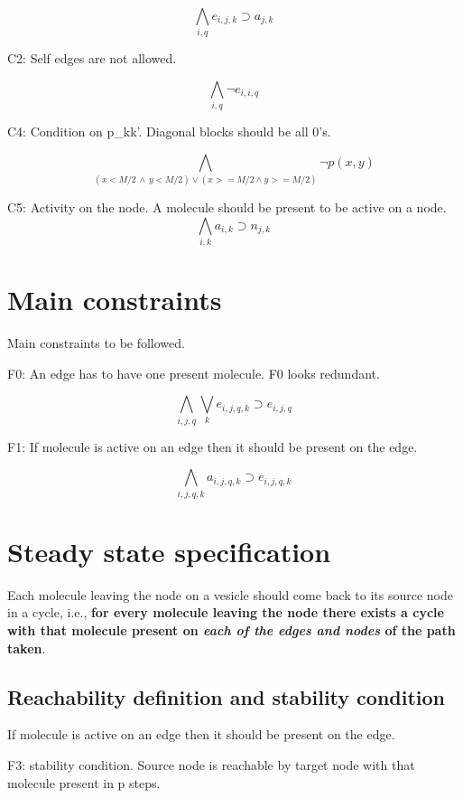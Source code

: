 \documentclass{llncs}
\begin{document}
\[ \bigwedge\limits_{i,q}  e_{i,j,k} \supset a_{j,k} \, \]  

C2: Self edges are not allowed. 

\[  \bigwedge\limits_{i,q} \neg e_{i,i,q} \, \]

C4: Condition on p\_kk'. Diagonal blocks should be all 0's.

\[ \bigwedge\limits_{(x < M/2 \, \land  \, y < M/2) \lor  (x >= M/2 \land y >= M/2)} \neg p(x,y) \, \]

C5: Activity on the node. A molecule should be present to be active on a node.  
\[ \bigwedge\limits_{i,k} a_{i,k} \supset n_{j,k} \, \]  




\section{Main constraints}
Main constraints to be followed. \newline

F0:  An edge has to have one present molecule. F0 looks redundant.

\[ \bigwedge\limits_{i,j,q} \bigvee_k e_{i,j,q,k} \supset e_{i,j,q} \, \]  

F1: If molecule is active on an edge then it should be present on the edge.

\[ \bigwedge\limits_{i,j,q,k} a_{i,j,q,k} \supset e_{i,j,q,k}\, \]



\section{Steady state specification}
Each molecule leaving the node on a vesicle should come back to its source node in a cycle, i.e., \textbf{for every molecule leaving the node there exists a cycle with that molecule present on \textit{each of the edges and nodes} of the path taken}.

\subsection{Reachability definition and stability condition}
If molecule is active on an edge then it should be present on the edge. \newline


F3: stability condition. Source node is reachable by target node with that molecule present in p steps.
\end{document}
